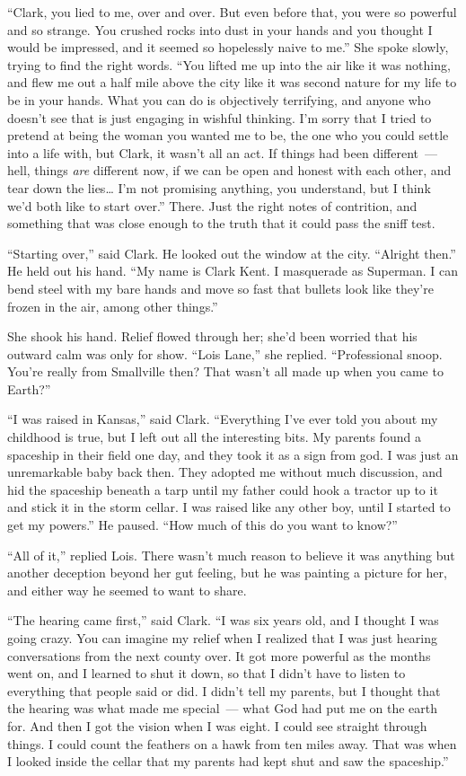 \documentclass[ebook,12pt]{memoir}
\begin{document}
``Clark, you lied to me, over and over. But even before that, you were
so powerful and so strange. You crushed rocks into dust in your hands
and you thought I would be impressed, and it seemed so hopelessly naive
to me.'' She spoke slowly, trying to find the right words. ``You lifted
me up into the air like it was nothing, and flew me out a half mile
above the city like it was second nature for my life to be in your
hands. What you can do is objectively terrifying, and anyone who doesn't
see that is just engaging in wishful thinking. I'm sorry that I tried to
pretend at being the woman you wanted me to be, the one who you could
settle into a life with, but Clark, it wasn't all an act. If things had
been different~--- hell, things \emph{are} different now, if we can be
open and honest with each other, and tear down the lies\ldots{} I'm not
promising anything, you understand, but I think we'd both like to start
over.'' There. Just the right notes of contrition, and something that
was close enough to the truth that it could pass the sniff test.

``Starting over,'' said Clark. He looked out the window at the city.
``Alright then.'' He held out his hand. ``My name is Clark Kent. I
masquerade as Superman. I can bend steel with my bare hands and move so
fast that bullets look like they're frozen in the air, among other
things.''

She shook his hand. Relief flowed through her; she'd been worried that
his outward calm was only for show. ``Lois Lane,'' she replied.
``Professional snoop. You're really from Smallville then? That wasn't
all made up when you came to Earth?''

``I was raised in Kansas,'' said Clark. ``Everything I've ever told you
about my childhood is true, but I left out all the interesting bits. My
parents found a spaceship in their field one day, and they took it as a
sign from god. I was just an unremarkable baby back then. They adopted
me without much discussion, and hid the spaceship beneath a tarp until
my father could hook a tractor up to it and stick it in the storm
cellar. I was raised like any other boy, until I started to get my
powers.'' He paused. ``How much of this do you want to know?''

``All of it,'' replied Lois. There wasn't much reason to believe it was
anything but another deception beyond her gut feeling, but he was
painting a picture for her, and either way he seemed to want to share.

``The hearing came first,'' said Clark. ``I was six years old, and I
thought I was going crazy. You can imagine my relief when I realized
that I was just hearing conversations from the next county over. It got
more powerful as the months went on, and I learned to shut it down, so
that I didn't have to listen to everything that people said or did. I
didn't tell my parents, but I thought that the hearing was what made me
special~--- what God had put me on the earth for. And then I got the
vision when I was eight. I could see straight through things. I could
count the feathers on a hawk from ten miles away. That was when I looked
inside the cellar that my parents had kept shut and saw the spaceship.''
\end{document}

